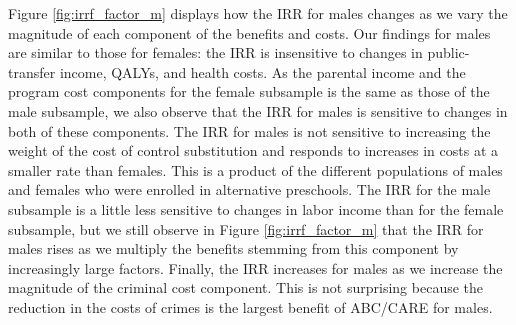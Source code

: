 \noindent Figure \ref{fig:irrf_factor_m} displays how the IRR for males changes as we vary the magnitude
of each component of the benefits and costs. Our findings for males are similar to
those for females: the IRR is insensitive to changes in public-transfer income, QALYs, and health costs. 
As the parental income and the program cost components for the female subsample is 
the same as those of the male subsample, we also observe that the IRR for males 
is sensitive to changes in both of these components. The IRR for males is not sensitive to increasing the weight of the cost of control substitution and responds to increases in costs at a smaller rate than females. 
This is a product of the different populations of males and females who were enrolled in alternative preschools.
The IRR for the male subsample is a little less sensitive to changes in labor income
than for the female subsample, but we still observe in Figure \ref{fig:irrf_factor_m}
that the IRR for males rises as we multiply the benefits stemming from this component by increasingly large factors. 
Finally, the IRR 
increases for males as we increase the magnitude of the criminal cost component. 
This is not surprising because the reduction in the costs of crimes is the largest 
benefit of ABC/CARE for males. 


